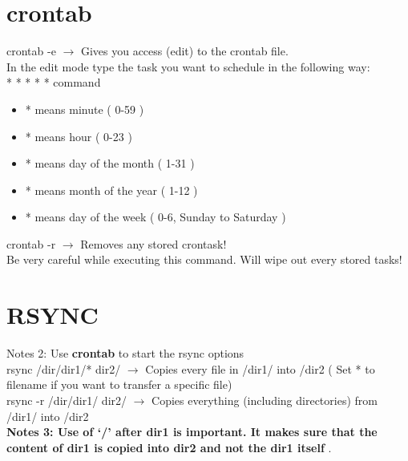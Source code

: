 \documentclass[twoside,a4paper]{article}
\newcommand{\tcb}{\color{blue}}
\newcommand{\tcc}{\color{cyan}}
\newcommand{\tcr}{\color{red}}
\newcommand{\tcg}{\color{gray}}
\newcommand{\tco}{\color{orange}}
\newcommand{\tcp}{\color{purple}}
\newcommand{\tck}{\color{black}}
\newcommand{\ra }{$\rightarrow$ }
\newcommand{\hs}{\hspace}
\begin{document}
\begin{multicols}{2}
    \tcc \section{crontab}
    \hs{-0.5 cm}\tcr crontab \tcb  -e \tck
    \ra Gives you access (edit) to the \tcr  crontab
    \tck  file.\\
    In the edit mode type the task you want to schedule in the following
    way:\\
    \tcr  \tcb  * \tcr  * \color{green} *
    \color{magenta} * \tcg  * \tck  command
    \tck
    \begin{itemize}
        \item \tcb  * \tck  means minute ( 0-59 )
        \item \tcr   * \tck  means hour ( 0-23 )
        \item \color{green} * \tck  means day of the month
              ( 1-31 )
        \item \color{magenta} * \tck  means month of the
              year ( 1-12 )
        \item \tcg  * \tck  means day of the week
              ( 0-6, Sunday to Saturday )
    \end{itemize}

    \hs{-0.7 cm} \tcr crontab \tcb  -r \tck
    \ra Removes any stored crontask! \tcg \\
    Be very careful while executing this command. Will wipe out every
    stored tasks!

    \tcc \section{RSYNC}
    \hs{-0.5cm}\tcg  Notes 2: Use \textbf{crontab} to start
    the rsync options\\
    \hs{-0.5 cm}\tcr rsync \tcp /dir/dir1/*
    \tco dir2/ \tck  \ra Copies every file in
    \tcp /dir1/ into \tco  /dir2 \tck ( Set *
    to filename if you want to transfer a specific file)\\
    \tcr rsync -r \tcp /dir/dir1/ \tco dir2/
    \tck  \ra Copies everything (including directories)
    from \tcp  /dir1/ \tck  into \tco /dir2
    \tck \\
    \tcg \textbf{Notes 3: Use of \textbf{`/'} after \textbf{dir1} is
        important. It makes sure that the content of \textbf{dir1} is copied
        into \textbf{dir2} and not the \textbf{dir1} itself }.\\


\end{multicols}
\end{document}

